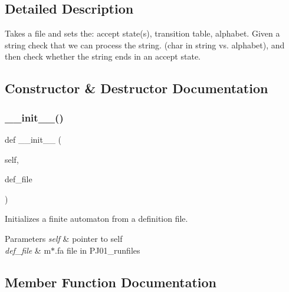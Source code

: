\subsection{Detailed Description}
\begin{DoxyVerb}Takes a file and sets the: accept state(s), transition table, alphabet.
Given a string check that we can process the string.
(char in string vs. alphabet), and then check whether the string ends in an accept state.
\end{DoxyVerb}
 

\subsection{Constructor \& Destructor Documentation}
\mbox{\label{classfinite__automaton_1_1_f_a_acc13390ea8996a5b9c95efec4ab3ac8c}} 
\subsubsection{\texorpdfstring{\+\_\+\+\_\+init\+\_\+\+\_\+()}{\_\_init\_\_()}}
{\footnotesize\ttfamily def \+\_\+\+\_\+init\+\_\+\+\_\+ (\begin{DoxyParamCaption}\item[{}]{self,  }\item[{}]{def\+\_\+file }\end{DoxyParamCaption})}



Initializes a finite automaton from a definition file. 


\begin{DoxyParams}{Parameters}
{\em self} & pointer to self \\
\hline
{\em def\+\_\+file} & m$\ast$.fa file in P\+J01\+\_\+runfiles \\
\hline
\end{DoxyParams}


\subsection{Member Function Documentation}
\mbox{\label{classfinite__automaton_1_1_f_a_a99687a41970ccfd859dacdf6ab41a0f1}} 
